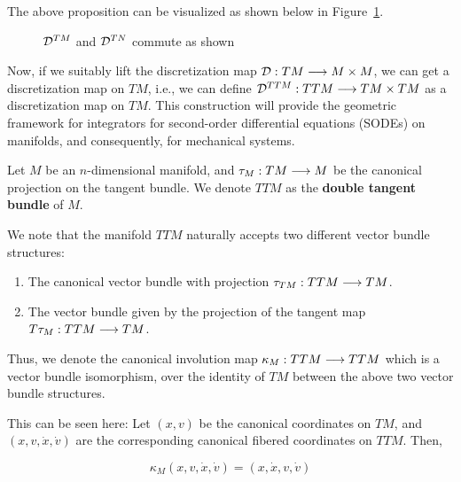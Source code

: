 The above proposition can be visualized as shown below in Figure~\ref{fig:commutator}.

\begin{figure}[h]
  \centering
  \caption{$\mathcal{D}^{TM}$ and $\mathcal{D}^{TN}$ commute as shown}
  \label{fig:commutator}
\end{figure}

Now, if we suitably lift the discretization map $\mathcal{D} : TM \longrightarrow M \times M$, we can get a discretization map on $TM$, i.e., we can define $\mathcal{D}^{TTM} : TTM \longrightarrow TM \times TM$ as a discretization map on $TM$. This construction will provide the geometric framework for integrators for second-order differential equations (SODEs) on manifolds, and consequently, for mechanical systems.

Let $M$ be an $n$-dimensional manifold, and $\tau_M : TM \longrightarrow M$ be the canonical projection on the tangent bundle. We denote $TTM$ as the \textbf{double tangent bundle} of $M$.

We note that the manifold $TTM$ naturally accepts two different vector bundle structures:

\begin{enumerate}
  \item The canonical vector bundle with projection $\tau_{TM} : TTM \longrightarrow TM$.
  \item The vector bundle given by the projection of the tangent map $T \tau_M : TTM \longrightarrow TM$. 
\end{enumerate}

Thus, we denote the canonical involution map $\kappa_M : TTM \longrightarrow TTM$ which is a vector bundle isomorphism, over the identity of $TM$ between the above two vector bundle structures.

This can be seen here: Let $(x,v)$ be the canonical coordinates on $TM$, and $(x, v, \dot{x}, \dot{v})$ are the corresponding canonical fibered coordinates on $TTM$. Then,

\[
 \kappa_M (x, v, \dot{x}, \dot{v}) = (x,\dot{x}, v, \dot{v})
\]

